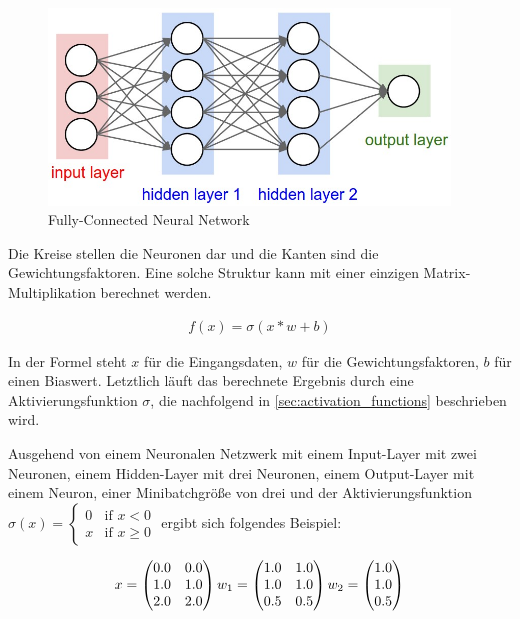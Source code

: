 \begin{figure}[H]
	\centering
	\includegraphics[width=0.95\textwidth]{resources/content/fully_connected.jpg}
	\caption{Fully-Connected Neural Network \cite{fully_connected_img}}
	\label{img:fully_connected}
\end{figure}

Die Kreise stellen die Neuronen dar und die Kanten sind die Gewichtungsfaktoren.
Eine solche Struktur kann mit einer einzigen Matrix-Multiplikation berechnet werden.

\begin{align}
	f(x) = \sigma(x * w + b)
\end{align}

In der Formel steht $ x $ für die Eingangsdaten, $ w $ für die Gewichtungsfaktoren, $ b $ für einen Biaswert. Letztlich läuft das berechnete Ergebnis durch eine Aktivierungsfunktion $ \sigma $, die nachfolgend in \ref{sec:activation_functions} beschrieben wird.

Ausgehend von einem Neuronalen Netzwerk mit einem Input-Layer mit zwei Neuronen, einem Hidden-Layer mit drei Neuronen, einem Output-Layer mit einem Neuron, einer Minibatchgröße von drei und der Aktivierungsfunktion $ \sigma(x) = {\begin{cases}0&{\text{if }}x<0\\x&{\text{if }}x\geq 0\end{cases}} $ ergibt sich folgendes Beispiel:

\begin{equation}
	\vspace{5pt}
	x = \begin{pmatrix} 
		0.0 & 0.0 \\
		1.0 & 1.0 \\ 
		2.0 & 2.0
	\end{pmatrix}
	\vspace{5pt}
	w_{1} = \begin{pmatrix} 
		1.0 & 1.0 \\
		1.0 & 1.0 \\ 
		0.5 & 0.5
	\end{pmatrix}
	\vspace{5pt}
	w_{2} = \begin{pmatrix} 
		1.0 \\
		1.0 \\ 
		0.5
	\end{pmatrix}
\end{equation}

